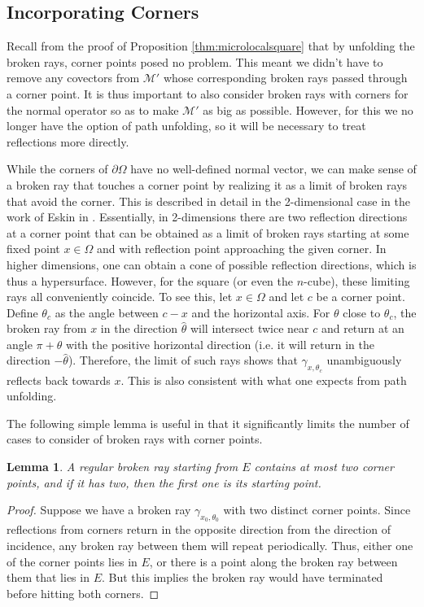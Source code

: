 \documentclass[10pt]{amsart}
\newtheorem{lemma}{Lemma}
\theoremstyle{definition}
\theoremstyle{definition}
\theoremstyle{definition}
\begin{document}
\subsection{Incorporating Corners\label{sec:corners}}
Recall from the proof of Proposition \ref{thm:microlocalsquare} that by unfolding the broken rays, corner points posed no problem. This meant we didn't have to remove any covectors from $\mathcal{M}'$ whose corresponding broken rays passed through a corner point. It is thus important to also consider broken rays with corners for the normal operator so as to make $\mathcal{M}'$ as big as possible. However, for this we no longer have the option of path unfolding, so it will be necessary to treat reflections more directly.

While the corners of $\partial \Omega$ have no well-defined normal vector, we can make sense of a broken ray that touches a corner point by realizing it as a limit of broken rays that avoid the corner. This is described in detail in the 2-dimensional case in the work of Eskin in \cite{eskin}. Essentially, in 2-dimensions there are two reflection directions at a corner point that can be obtained as a limit of broken rays starting at some fixed point $x \in \Omega$ and with reflection point approaching the given corner. In higher dimensions, one can obtain a cone of possible reflection directions, which is thus a hypersurface. However, for the square (or even the $n$-cube), these limiting rays all conveniently coincide. To see this, let $x\in \Omega$ and let $c$ be a corner point. Define $\theta_{c}$ as the angle between $c-x$ and the horizontal axis. For $\theta$ close to $\theta_{c}$, the broken ray from $x$ in the direction $\widehat{\theta}$ will intersect twice near $c$ and return at an angle $\pi+\theta$ with the positive horizontal direction (i.e. it will return in the direction $-\widehat{\theta}$). Therefore, the limit of such rays shows that $\gamma_{x,\theta_{c}}$ unambiguously reflects back towards $x$. This is also consistent with what one expects from path unfolding.

The following simple lemma is useful in that it significantly limits the number of cases to consider of broken rays with corner points.
\begin{lemma}A regular broken ray starting from $E$ contains at most two corner points, and if it has two, then the first one is its starting point.\end{lemma}
\begin{proof}Suppose we have a broken ray $\gamma_{x_{0},\theta_{0}}$ with two distinct corner points. Since reflections from corners return in the opposite direction from the direction of incidence, any broken ray between them will repeat periodically. Thus, either one of the corner points lies in $E$, or there is a point along the broken ray between them that lies in $E$. But this implies the broken ray would have terminated before hitting both corners.\end{proof}
\end{document}
